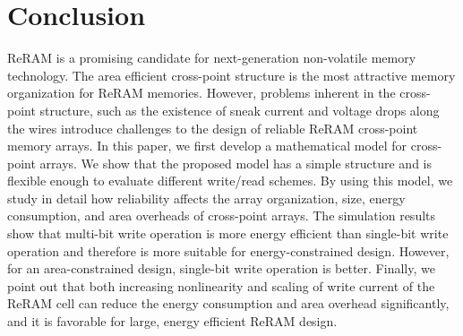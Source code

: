 
\section{Conclusion}\label{sec:conclusion}
\vspace{10pt} ReRAM is a promising candidate for next-generation
non-volatile memory technology. The area efficient cross-point structure
is the most attractive memory organization for ReRAM memories.
However, problems inherent in the cross-point structure, such as the
existence of sneak current and voltage drops along the wires introduce
challenges to the design of reliable ReRAM cross-point memory arrays. In this
paper, we first develop a mathematical model for cross-point arrays. We
show that the proposed model has a simple structure and is flexible enough to
evaluate different write/read schemes. By using this model, we study in
detail how reliability affects the array organization, size, energy
consumption, and area overheads of cross-point arrays. The
simulation results show that multi-bit write operation is more energy
efficient than single-bit write operation and therefore is more suitable
for energy-constrained design. However, for an area-constrained design,
single-bit write operation is better. Finally, we point out that both
increasing nonlinearity and scaling of write current of the ReRAM cell
can reduce the energy consumption and area overhead significantly, and it
is favorable for large, energy efficient ReRAM design.
